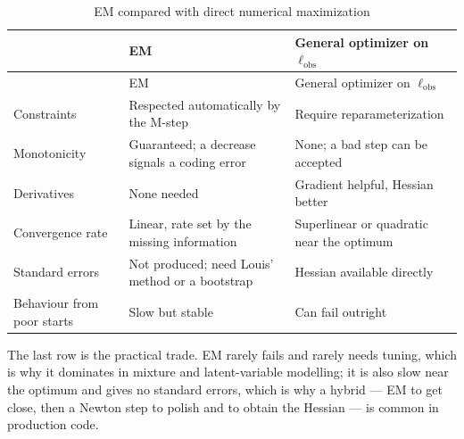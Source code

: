 \documentclass[
  letterpaper,
  DIV=11,
  numbers=noendperiod]{scrreprt}
\begin{document}
\begin{longtable}[]{@{}
  >{\raggedright\arraybackslash}p{}
  >{\raggedright\arraybackslash}p{}
  >{\raggedright\arraybackslash}p{}@{}}
\caption{EM compared with direct numerical
maximization}\label{tbl-em-vs-optim}\tabularnewline
\toprule\noalign{}
\begin{minipage}[b]{\linewidth}\raggedright
\end{minipage} & \begin{minipage}[b]{\linewidth}\raggedright
EM
\end{minipage} & \begin{minipage}[b]{\linewidth}\raggedright
General optimizer on \(\ell_{\text{obs}}\)
\end{minipage} \\
\midrule\noalign{}
\endfirsthead
\toprule\noalign{}
\begin{minipage}[b]{\linewidth}\raggedright
\end{minipage} & \begin{minipage}[b]{\linewidth}\raggedright
EM
\end{minipage} & \begin{minipage}[b]{\linewidth}\raggedright
General optimizer on \(\ell_{\text{obs}}\)
\end{minipage} \\
\midrule\noalign{}
\endhead
\bottomrule\noalign{}
\endlastfoot
Constraints & Respected automatically by the M-step & Require
reparameterization \\
Monotonicity & Guaranteed; a decrease signals a coding error & None; a
bad step can be accepted \\
Derivatives & None needed & Gradient helpful, Hessian better \\
Convergence rate & Linear, rate set by the missing information &
Superlinear or quadratic near the optimum \\
Standard errors & Not produced; need Louis' method or a bootstrap &
Hessian available directly \\
Behaviour from poor starts & Slow but stable & Can fail outright \\
\end{longtable}

The last row is the practical trade. EM rarely fails and rarely needs
tuning, which is why it dominates in mixture and latent-variable
modelling; it is also slow near the optimum and gives no standard
errors, which is why a hybrid --- EM to get close, then a Newton step to
polish and to obtain the Hessian --- is common in production code.
\end{document}
